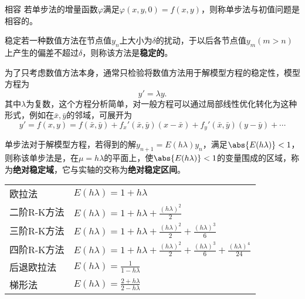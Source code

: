 \begin{defn}{相容}
若单步法的增量函数$\varphi$满足$\varphi(x,y,0)=f(x,y)$，则称单步法与初值问题是相容的。
\end{defn}
\begin{defn}{稳定}若一种数值方法在节点值$y_n$上大小为$\delta$的扰动，于以后各节点值$y_m(m>n)$上产生的偏差不超过$\delta$，则称该方法是\textbf{稳定的}。
\end{defn}
为了只考虑数值方法本身，通常只检验将数值方法用于解模型方程的稳定性，模型方程为
\[
y'=\lambda y.
\]
其中$\lambda$为复数，这个方程分析简单，对一般方程可以通过局部线性优化转化为这种形式，例如在$\bar{x},\bar{y}$的邻域，可展开为
\[
y'=f(x,y)=f(\bar{x},\bar{y})+f_x'(\bar{x},\bar{y})(x-\bar{x})+f_y'(\bar{x},\bar{y})(y-\bar{y})+\cdots
\]
\begin{defn}
单步法对于解模型方程，若得到的解$y_{n+1}=E(h\lambda)y_n$，满足$\abs{E(h\lambda)}<1$，则称该单步法是，在$\mu=h\lambda$的平面上，使$\abs{E(h\lambda)}<1$的变量围成的区域，称为\textbf{绝对稳定域}，它与实轴的交称为\textbf{绝对稳定区间}。
\end{defn}

\begin{tabular}{ll}
欧拉法 & $E(h\lambda)=1+h\lambda$ \\
二阶R-K方法 & $E(h\lambda)=1+h\lambda+\frac{(h\lambda)^2}{2}$ \\
三阶R-K方法 & $E(h\lambda)=1+h\lambda+\frac{(h\lambda)^2}{2}+\frac{(h\lambda)^3}{6}$ \\
四阶R-K方法 & $E(h\lambda)=1+h\lambda+\frac{(h\lambda)^2}{2}+\frac{(h\lambda)^3}{6}+\frac{(h\lambda)^4}{24}$ \\
后退欧拉法 & $E(h\lambda)=\frac{1}{1-h\lambda}$ \\
梯形法 & $E(h\lambda)=\frac{2+h\lambda}{2-h\lambda}$
\end{tabular} 